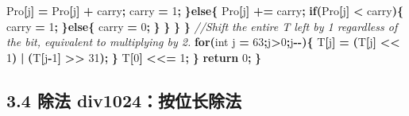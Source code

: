 \documentclass[11pt,a4paper]{ctexart}
\newenvironment{Shaded}{\begin{snugshade}}{\end{snugshade}}
\newcommand{\CommentTok}[1]{\textcolor[rgb]{0.56,0.35,0.01}{\textit{#1}}}
\newcommand{\ControlFlowTok}[1]{\textcolor[rgb]{0.13,0.29,0.53}{\textbf{#1}}}
\newcommand{\DataTypeTok}[1]{\textcolor[rgb]{0.13,0.29,0.53}{#1}}
\newcommand{\DecValTok}[1]{\textcolor[rgb]{0.00,0.00,0.81}{#1}}
\newcommand{\NormalTok}[1]{#1}
\newcommand{\OperatorTok}[1]{\textcolor[rgb]{0.81,0.36,0.00}{\textbf{#1}}}
\renewenvironment{Shaded}{\begin{snugshade}}{\end{snugshade}}
\begin{document}
\begin{Shaded}
\begin{Highlighting}[]
\NormalTok{                    Pro}\OperatorTok{[}\NormalTok{j}\OperatorTok{]} \OperatorTok{=}\NormalTok{ Pro}\OperatorTok{[}\NormalTok{j}\OperatorTok{]} \OperatorTok{+}\NormalTok{ carry}\OperatorTok{;}
\NormalTok{                    carry }\OperatorTok{=} \DecValTok{1}\OperatorTok{;}
                \OperatorTok{\}}\ControlFlowTok{else}\OperatorTok{\{}
\NormalTok{                    Pro}\OperatorTok{[}\NormalTok{j}\OperatorTok{]} \OperatorTok{+=}\NormalTok{ carry}\OperatorTok{;}
                    \ControlFlowTok{if}\OperatorTok{(}\NormalTok{Pro}\OperatorTok{[}\NormalTok{j}\OperatorTok{]} \OperatorTok{\textless{}}\NormalTok{ carry}\OperatorTok{)\{}
\NormalTok{                        carry }\OperatorTok{=} \DecValTok{1}\OperatorTok{;}
                    \OperatorTok{\}}\ControlFlowTok{else}\OperatorTok{\{}
\NormalTok{                        carry }\OperatorTok{=} \DecValTok{0}\OperatorTok{;}
                    \OperatorTok{\}}
                \OperatorTok{\}}
            \OperatorTok{\}}
        \OperatorTok{\}}
        \CommentTok{//Shift the entire T left by 1 regardless of the bit, equivalent to multiplying by 2.}
        \ControlFlowTok{for}\OperatorTok{(}\DataTypeTok{int}\NormalTok{ j }\OperatorTok{=} \DecValTok{63}\OperatorTok{;}\NormalTok{j}\OperatorTok{\textgreater{}}\DecValTok{0}\OperatorTok{;}\NormalTok{j}\OperatorTok{{-}{-})\{}
\NormalTok{            T}\OperatorTok{[}\NormalTok{j}\OperatorTok{]} \OperatorTok{=} \OperatorTok{(}\NormalTok{T}\OperatorTok{[}\NormalTok{j}\OperatorTok{]} \OperatorTok{\textless{}\textless{}} \DecValTok{1}\OperatorTok{)} \OperatorTok{|} \OperatorTok{(}\NormalTok{T}\OperatorTok{[}\NormalTok{j}\OperatorTok{{-}}\DecValTok{1}\OperatorTok{]} \OperatorTok{\textgreater{}\textgreater{}} \DecValTok{31}\OperatorTok{);}
        \OperatorTok{\}}
\NormalTok{        T}\OperatorTok{[}\DecValTok{0}\OperatorTok{]} \OperatorTok{\textless{}\textless{}=} \DecValTok{1}\OperatorTok{;}
    \OperatorTok{\}}
    \ControlFlowTok{return} \DecValTok{0}\OperatorTok{;}
\OperatorTok{\}}
\end{Highlighting}
\end{Shaded}

\FloatBarrier

\hypertarget{ux9664ux6cd5-div1024ux6309ux4f4dux957fux9664ux6cd5}{%
\subsection{3.4 除法
div1024：按位长除法}\label{ux9664ux6cd5-div1024ux6309ux4f4dux957fux9664ux6cd5}}
\end{document}
